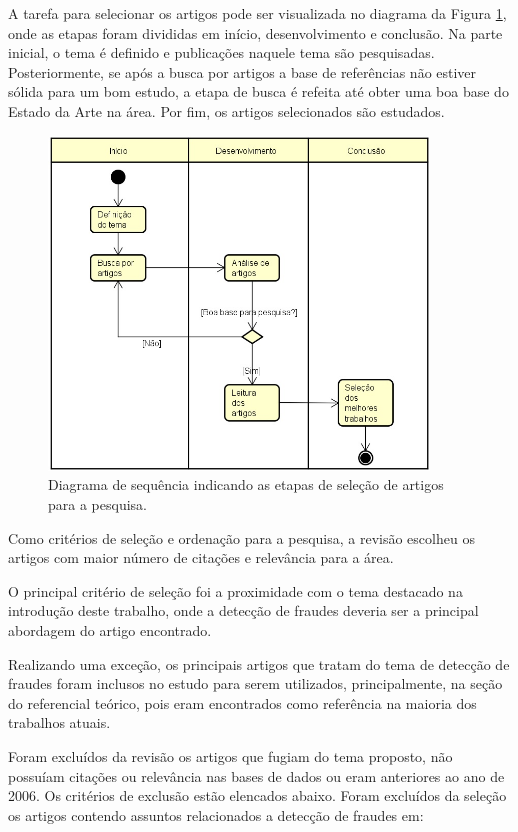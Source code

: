 \documentclass[smallextended]{svjour3}
\begin{document}
A tarefa para selecionar os artigos pode ser visualizada no diagrama da Figura \ref{fig:diagrama}, onde as etapas foram divididas em início, desenvolvimento e conclusão. Na parte inicial, o tema é definido e publicações naquele tema são pesquisadas. Posteriormente, se após a busca por artigos a base de referências não estiver sólida para um bom estudo, a etapa de busca é refeita até obter uma boa base do Estado da Arte na área. Por fim, os artigos selecionados são estudados. 

\begin{figure}[!ht]
	\centering
	\includegraphics[width=0.9\textwidth]{imagens/diagrama.jpg}
	\caption{Diagrama de sequência indicando as etapas de seleção de artigos para a pesquisa.}
	\label{fig:diagrama}
\end{figure}

Como critérios de seleção e ordenação para a pesquisa, a revisão escolheu os artigos com maior número de citações e relevância para a área. 

O principal critério de seleção foi a proximidade com o tema destacado na introdução deste trabalho, onde a detecção de fraudes deveria ser a principal abordagem do artigo encontrado.

Realizando uma exceção, os principais artigos que tratam do tema de detecção de fraudes foram inclusos no estudo para serem utilizados, principalmente, na seção do referencial teórico, pois eram encontrados como referência na maioria dos trabalhos atuais.

Foram excluídos da revisão os artigos que fugiam do tema proposto, não possuíam citações ou relevância nas bases de dados ou eram anteriores ao ano de 2006. Os critérios de exclusão estão elencados abaixo. Foram excluídos da seleção os artigos contendo assuntos relacionados a detecção de fraudes em:
\end{document}
